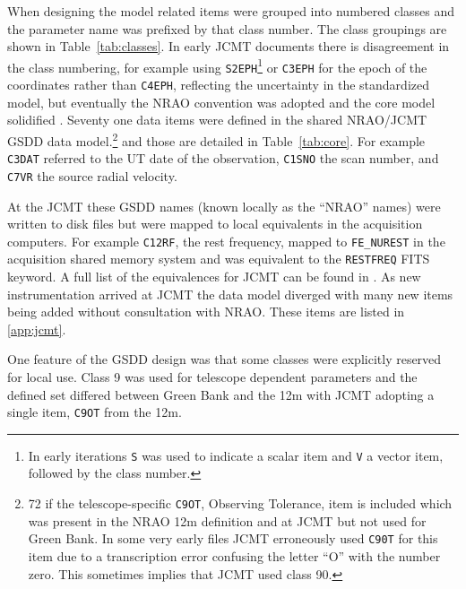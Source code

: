 \documentclass[final,authoryear,5p,times,twocolumn]{elsarticle}
\begin{document}
When designing the model related items were grouped into numbered
classes and the parameter name was prefixed by that class number. The
class groupings are shown in Table~\ref{tab:classes}. In early JCMT
documents \citep[e.g.][]{mtdn1,mtdn84} there is disagreement in the class
numbering, for example using \texttt{S2EPH}\footnote{In early
  iterations \texttt{S} was used to indicate a scalar item and
  \texttt{V} a vector item, followed by the class number.} or \texttt{C3EPH} for the epoch of the
coordinates rather than \texttt{C4EPH}, reflecting the uncertainty in
the standardized model, but eventually \citep[see e.g.][]{mtdn85}
the NRAO convention was adopted and the core model solidified
\citep[][defined the NRAO naming scheme]{tcus5}.
Seventy one data items were defined in the shared NRAO/JCMT GSDD data
model.\footnote{72 if the telescope-specific \texttt{C9OT}, Observing
  Tolerance, item is included which was present in the NRAO 12m
  definition and at JCMT but not used for Green Bank. In some very
  early files JCMT erroneously used \texttt{C90T} for this item due to
  a transcription error confusing the letter ``O'' with the number
  zero. This sometimes implies that JCMT used class 90.} and those are
detailed in Table~\ref{tab:core}. For example \texttt{C3DAT} referred
to the UT date of the observation, \texttt{C1SNO} the scan number,
and \texttt{C7VR} the source radial velocity.

At the JCMT these GSDD names (known locally as the ``NRAO'' names)
were written to disk files but were mapped to local equivalents in
the acquisition computers. For example \texttt{C12RF}, the rest
frequency, mapped to \texttt{FE\_NUREST} in the acquisition shared
memory system and
was equivalent to the \texttt{RESTFREQ} FITS keyword. A full list of
the equivalences for JCMT can be found in \citet{SUN229}. As new
instrumentation arrived at JCMT the data model diverged with many new
items being added without consultation with NRAO. These items are
listed in \ref{app:jcmt}.

One feature of the GSDD design was that some classes were
explicitly reserved for local use. Class 9 was used for telescope
dependent parameters and the defined set differed between Green Bank
and the 12m with JCMT adopting a single item, \texttt{C9OT} from the
12m.
\end{document}
